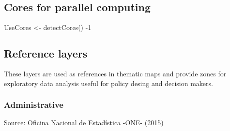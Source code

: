 \documentclass[10pt,landscape,a3paper]{article}
\newenvironment{Shaded}{\begin{snugshade}}{\end{snugshade}}
\newcommand{\DecValTok}[1]{\textcolor[rgb]{0.00,0.00,0.81}{#1}}
\newcommand{\FunctionTok}[1]{\textcolor[rgb]{0.00,0.00,0.00}{#1}}
\newcommand{\NormalTok}[1]{#1}
\newcommand{\OtherTok}[1]{\textcolor[rgb]{0.56,0.35,0.01}{#1}}
\newcommand{\SpecialCharTok}[1]{\textcolor[rgb]{0.00,0.00,0.00}{#1}}
\begin{document}
\hypertarget{cores-for-parallel-computing}{%
\subsection{Cores for parallel
computing}\label{cores-for-parallel-computing}}

\begin{Shaded}
\begin{Highlighting}[]
\NormalTok{UseCores }\OtherTok{\textless{}{-}} \FunctionTok{detectCores}\NormalTok{() }\SpecialCharTok{{-}}\DecValTok{1}
\end{Highlighting}
\end{Shaded}

\hypertarget{reference-layers}{%
\subsection{Reference layers}\label{reference-layers}}

These layers are used as references in thematic maps and provide zones
for exploratory data analysis useful for policy desing and decision
makers.

\hypertarget{administrative}{%
\subsubsection{Administrative}\label{administrative}}

Source: Oficina Nacional de Estadística -ONE- (2015)
\end{document}
